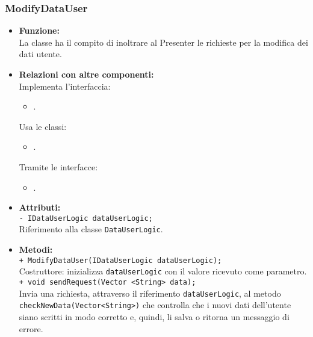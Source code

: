 {\begin{sloppypar}
{		%
		\subsubsection{ModifyDataUser}\label{ssub:ModifyDataUser}{
		\begin{itemize}
			\item[] \textbf{Funzione:}\\
				  La classe ha il compito di inoltrare al Presenter le richieste per la modifica dei dati utente.\\
				
			\item[] \textbf{Relazioni con altre componenti:}\\
				Implementa l'interfaccia:
				\begin{itemize}
					\item[] .
				\end{itemize}
				Usa le classi:
				\begin{itemize}
					\item[] .
				\end{itemize}
				Tramite le interfacce:
				\begin{itemize}
					\item[] .\\
				\end{itemize}

			\item[] \textbf{Attributi:}\\
				\texttt{- IDataUserLogic dataUserLogic;}\\
				Riferimento alla classe \texttt{DataUserLogic}.\\
				
			\item[] \textbf{Metodi:}\\
				\texttt{+ ModifyDataUser(IDataUserLogic dataUserLogic);}\\
				Costruttore: inizializza \texttt{dataUserLogic} con il valore ricevuto come parametro.\\
				
				\texttt{+ void sendRequest(Vector <String> data);}\\
				Invia una richiesta, attraverso il riferimento \texttt{dataUserLogic}, al metodo \texttt{checkNewData(Vector<String>)} che controlla che i nuovi dati dell'utente siano scritti in modo corretto e, quindi, li salva o ritorna un messaggio di errore.\\
		\end{itemize}
		}

}
\end{sloppypar}}
